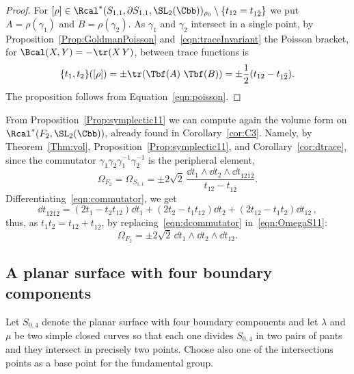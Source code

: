 \begin{proof}
For $[\rho]\in\Rcal^*(S_{1,1},\partial S_{1,1}, \SL_2(\Cbb))_{\rho_0}\setminus\{t_{12}= t_{1\bar 2}\}$ we put $A=\rho(\gamma_1)$ and $B=\rho(\gamma_2)$. As $\gamma_1$ and $\gamma_2$ intersect in a single point, by Proposition~\ref{Prop:GoldmanPoisson} and~\eqref{eqn:traceInvariant} the Poisson bracket, for $\Bcal(X,Y)= -\tr (X\, Y)$, between trace functions is
\[
\{t_1,t_2\}([\rho])=\pm \tr(\operatorname{\Tbf}(A)\, \operatorname{\Tbf}(B)) =\pm\frac12(t_{12}-t_{1\bar 2}).
\]
The proposition follows from Equation~\eqref{eqn:poisson}.
\end{proof}



\begin{rema}
From Proposition~\ref{Prop:symplectic11} we can compute again the volume form on $\Rcal^*(F_2,\SL_2(\Cbb))$, already found in Corollary~\ref{cor:C3}. Namely, by Theorem~\ref{Thm:vol}, Proposition~\ref{Prop:symplectic11}, and Corollary~\ref{cor:dtrace}, since the commutator $\gamma_1\gamma_2\gamma_1^{-1}\gamma_2^{-1}$ is the peripheral element,
\begin{equation}\label{eqn:OmegaS11}
\Omega_{F_2} =\Omega_{S_{1,1}} =\pm 2\sqrt{2}\,\frac{\dd t_1\wedge \dd t_2\wedge \dd t_{12\bar 1\bar 2}}{t_{12}-t_{1 \bar2}}.
\end{equation}
Differentiating~\eqref{eqn:commutator}, we get
\begin{equation}\label{eqn:dcommutator}
\dd t_{12\bar 1\bar2} = (2 t_1-t_2t_{12}) \dd t_1 + (2 t_2-t_1t_{12}) \dd t_2 + (2 t_{12}-t_1t_{2}) \dd t_{12}\,,
\end{equation}
thus, as $t_1t_2=t_{12}+t_{1\bar 2}$, by replacing~\eqref{eqn:dcommutator} in~\eqref{eqn:OmegaS11}:
\[
\Omega_{F_2} =\pm 2\sqrt{2}\, \dd t_1\wedge \dd t_2\wedge \dd t_{12}.
\]
\end{rema}



\subsection{A planar surface with four boundary components}\label{sec:S04}

Let $S_{0,4}$ denote the planar surface with four boundary components and let $\lambda$ and $\mu$ be two simple closed curves so that each one divides $S_{0,4}$ in two pairs of pants and they intersect in precisely two points. Choose also one of the intersections points as a base point for the fundamental group.

